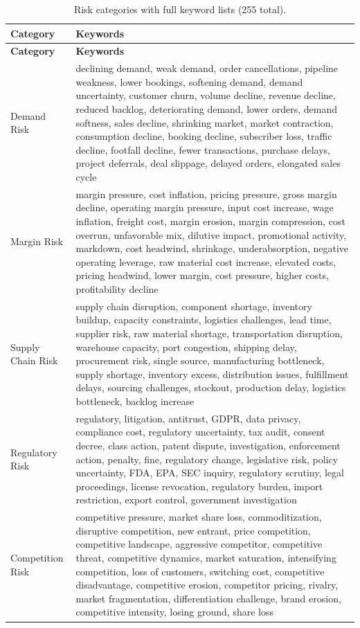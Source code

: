 \documentclass[12pt,a4paper]{article}
\begin{document}
\begin{longtable}{@{}lp{11cm}@{}}
\caption{Risk categories with full keyword lists (255 total).} \label{tab:risk-keywords} \\
\toprule
\textbf{Category} & \textbf{Keywords} \\
\midrule
\endfirsthead
\toprule
\textbf{Category} & \textbf{Keywords} \\
\midrule
\endhead
Demand Risk & declining demand, weak demand, order cancellations, pipeline weakness, lower bookings, softening demand, demand uncertainty, customer churn, volume decline, revenue decline, reduced backlog, deteriorating demand, lower orders, demand softness, sales decline, shrinking market, market contraction, consumption decline, booking decline, subscriber loss, traffic decline, footfall decline, fewer transactions, purchase delays, project deferrals, deal slippage, delayed orders, elongated sales cycle \\
\midrule
Margin Risk & margin pressure, cost inflation, pricing pressure, gross margin decline, operating margin pressure, input cost increase, wage inflation, freight cost, margin erosion, margin compression, cost overrun, unfavorable mix, dilutive impact, promotional activity, markdown, cost headwind, shrinkage, underabsorption, negative operating leverage, raw material cost increase, elevated costs, pricing headwind, lower margin, cost pressure, higher costs, profitability decline \\
\midrule
Supply Chain Risk & supply chain disruption, component shortage, inventory buildup, capacity constraints, logistics challenges, lead time, supplier risk, raw material shortage, transportation disruption, warehouse capacity, port congestion, shipping delay, procurement risk, single source, manufacturing bottleneck, supply shortage, inventory excess, distribution issues, fulfillment delays, sourcing challenges, stockout, production delay, logistics bottleneck, backlog increase \\
\midrule
Regulatory Risk & regulatory, litigation, antitrust, GDPR, data privacy, compliance cost, regulatory uncertainty, tax audit, consent decree, class action, patent dispute, investigation, enforcement action, penalty, fine, regulatory change, legislative risk, policy uncertainty, FDA, EPA, SEC inquiry, regulatory scrutiny, legal proceedings, license revocation, regulatory burden, import restriction, export control, government investigation \\
\midrule
Competition Risk & competitive pressure, market share loss, commoditization, disruptive competition, new entrant, price competition, competitive landscape, aggressive competitor, competitive threat, competitive dynamics, market saturation, intensifying competition, loss of customers, switching cost, competitive disadvantage, competitive erosion, competitor pricing, rivalry, market fragmentation, differentiation challenge, brand erosion, competitive intensity, losing ground, share loss \\

\end{longtable}
\end{document}
